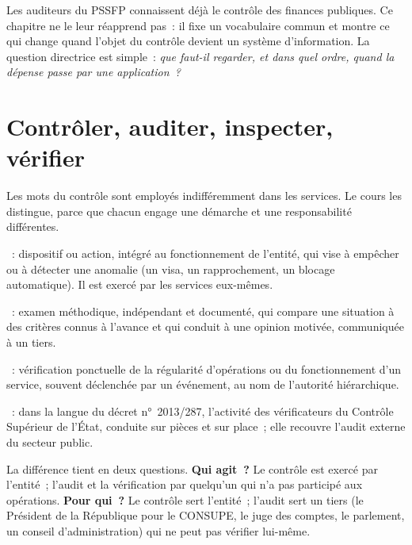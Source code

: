 Les auditeurs du PSSFP connaissent déjà le contrôle des finances
publiques. Ce chapitre ne le leur réapprend pas~: il fixe un vocabulaire
commun et montre ce qui change quand l'objet du contrôle devient un système
d'information. La question directrice est simple~: \emph{que faut-il
regarder, et dans quel ordre, quand la dépense passe par une
application~?}

\separateur

\section{Contrôler, auditer, inspecter, vérifier}
\label{sec:c01-notions}

Les mots du contrôle sont employés indifféremment dans les services. Le
cours les distingue, parce que chacun engage une démarche et une
responsabilité différentes.

\begin{boxdef}
~: dispositif ou action, intégré au
fonctionnement de l'entité, qui vise à empêcher ou à détecter une anomalie
(un visa, un rapprochement, un blocage automatique). Il est exercé par les
services eux-mêmes.

\medskip
{}~: examen méthodique, indépendant et
documenté, qui compare une situation à des critères connus à l'avance et
qui conduit à une opinion motivée, communiquée à un tiers.

\medskip
{}~: vérification ponctuelle de la
régularité d'opérations ou du fonctionnement d'un service, souvent
déclenchée par un événement, au nom de l'autorité hiérarchique.

\medskip
{}~: dans la langue du décret
n°~2013/287, l'activité des vérificateurs du Contrôle Supérieur de l'État,
conduite sur pièces et sur place~; elle recouvre l'audit externe du
secteur public.
\end{boxdef}

La différence tient en deux questions. \textbf{Qui agit~?} Le contrôle est
exercé par l'entité~; l'audit et la vérification par quelqu'un qui n'a pas
participé aux opérations. \textbf{Pour qui~?} Le contrôle sert l'entité~;
l'audit sert un tiers (le Président de la République pour le CONSUPE, le
juge des comptes, le parlement, un conseil d'administration) qui ne peut
pas vérifier lui-même.

